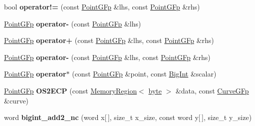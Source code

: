 \begin{DoxyCompactItemize}
\item 
\hypertarget{namespaceBotan_ac92cb68537b7bb61311f7b214c6a01ca}{bool {\bfseries operator!=} (const \hyperlink{classBotan_1_1PointGFp}{Point\-G\-Fp} \&lhs, const \hyperlink{classBotan_1_1PointGFp}{Point\-G\-Fp} \&rhs)}\label{namespaceBotan_ac92cb68537b7bb61311f7b214c6a01ca}

\item 
\hypertarget{namespaceBotan_a3ec2a919f0d3e9a53b081f3647ef0831}{\hyperlink{classBotan_1_1PointGFp}{Point\-G\-Fp} {\bfseries operator-\/} (const \hyperlink{classBotan_1_1PointGFp}{Point\-G\-Fp} \&lhs)}\label{namespaceBotan_a3ec2a919f0d3e9a53b081f3647ef0831}

\item 
\hypertarget{namespaceBotan_ac3cb3ef72a835fa7742d7514a4aedab1}{\hyperlink{classBotan_1_1PointGFp}{Point\-G\-Fp} {\bfseries operator+} (const \hyperlink{classBotan_1_1PointGFp}{Point\-G\-Fp} \&lhs, const \hyperlink{classBotan_1_1PointGFp}{Point\-G\-Fp} \&rhs)}\label{namespaceBotan_ac3cb3ef72a835fa7742d7514a4aedab1}

\item 
\hypertarget{namespaceBotan_aa7e066f87e0618c623684de6276d71fe}{\hyperlink{classBotan_1_1PointGFp}{Point\-G\-Fp} {\bfseries operator-\/} (const \hyperlink{classBotan_1_1PointGFp}{Point\-G\-Fp} \&lhs, const \hyperlink{classBotan_1_1PointGFp}{Point\-G\-Fp} \&rhs)}\label{namespaceBotan_aa7e066f87e0618c623684de6276d71fe}

\item 
\hypertarget{namespaceBotan_ad833dc0e005704e4e640e7090b1d2753}{\hyperlink{classBotan_1_1PointGFp}{Point\-G\-Fp} {\bfseries operator$\ast$} (const \hyperlink{classBotan_1_1PointGFp}{Point\-G\-Fp} \&point, const \hyperlink{classBotan_1_1BigInt}{Big\-Int} \&scalar)}\label{namespaceBotan_ad833dc0e005704e4e640e7090b1d2753}

\item 
\hypertarget{namespaceBotan_ae64e0beb6942b865aab635311d382575}{\hyperlink{classBotan_1_1PointGFp}{Point\-G\-Fp} {\bfseries O\-S2\-E\-C\-P} (const \hyperlink{classBotan_1_1MemoryRegion}{Memory\-Region}$<$ \hyperlink{namespaceBotan_a7d793989d801281df48c6b19616b8b84}{byte} $>$ \&data, const \hyperlink{classBotan_1_1CurveGFp}{Curve\-G\-Fp} \&curve)}\label{namespaceBotan_ae64e0beb6942b865aab635311d382575}

\item 
\hypertarget{namespaceBotan_ab8f4a27c1c5bf03f1a8dab57f2a41a13}{word {\bfseries bigint\-\_\-add2\-\_\-nc} (word x\mbox{[}$\,$\mbox{]}, size\-\_\-t x\-\_\-size, const word y\mbox{[}$\,$\mbox{]}, size\-\_\-t y\-\_\-size)}\label{namespaceBotan_ab8f4a27c1c5bf03f1a8dab57f2a41a13}


\end{DoxyCompactItemize}
